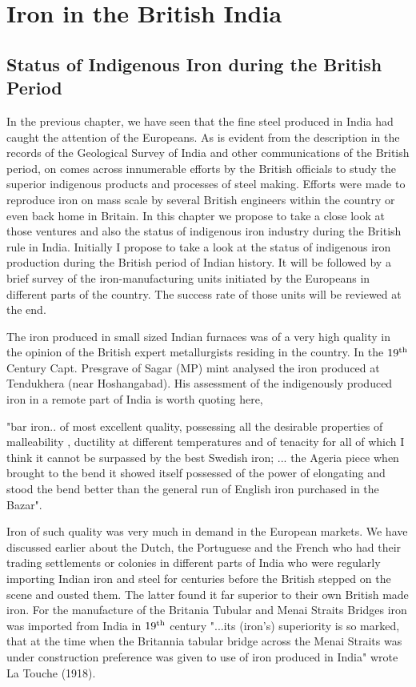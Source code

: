 \chapter{Iron in the British India}\label{chapter6}

\section*{Status of Indigenous Iron during the British Period}\label{section-1}

In the previous chapter, we have seen that the fine steel produced in India had caught the attention of the Europeans. As is evident from the description in the records of the Geological Survey of India and other communications of the British period, on comes across innumerable efforts by the British officials to study the superior indigenous products and processes of steel making. Efforts were made to reproduce iron on mass scale by several British engineers within the country or even back home in Britain. In this chapter we propose to take a close look at those ventures and also the status of indigenous iron industry during the British rule in India. Initially I propose to take a look at the status of indigenous iron production during the British period of Indian history. It will be followed by a brief survey of the iron-manufacturing units initiated by the Europeans in different parts of the country. The success rate of those units will be reviewed at the end.

The iron produced in small sized Indian furnaces was of a very high quality in the opinion of the British expert metallurgists residing in the country.  In the $19^{\rm th}$ Century Capt. Presgrave of Sagar (MP) mint analysed the iron produced at Tendukhera (near Hoshangabad).  His assessment of the indigenously produced iron in a remote part of India is worth quoting here,

"bar iron.. of most excellent quality, possessing all the desirable properties of malleability , ductility at different temperatures and of tenacity for all of which I think it cannot be surpassed by the best Swedish iron; ... the Ageria piece when brought to the bend it showed itself possessed of the power of elongating and stood the bend better than the general run of English iron purchased in the Bazar".

Iron of such quality was very much in demand in the European markets.  We have discussed earlier about the Dutch, the Portuguese and the French who had their trading settlements or colonies in different parts of India who were regularly importing Indian iron and steel for centuries before the British stepped on the scene and ousted them.  The latter found it far superior to their own British made iron.  For the manufacture of the Britania Tubular and Menai Straits Bridges iron was imported from India in $19^{\rm th}$ century "...its (iron's) superiority is so marked, that at the time when the Britannia tabular bridge across the Menai Straits was under construction preference was given to use of iron produced in India" wrote La Touche (1918).

